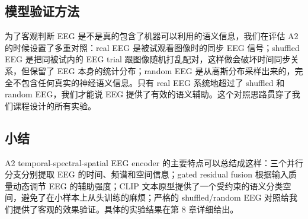 \subsection{模型验证方法}

为了客观判断 EEG 是不是真的包含了机器可以利用的语义信息，我们在评估 A2 的时候设置了多重对照：real EEG 是被试观看图像时的同步 EEG 信号；shuffled EEG 是把同被试内的 EEG trial 跟图像随机打乱配对，这样做会破坏时间同步关系，但保留了 EEG 本身的统计分布；random EEG 是从高斯分布采样出来的，完全不包含任何真实的神经语义信息。只有 real EEG 系统地超过了 shuffled 和 random EEG，我们才能说 EEG 提供了有效的语义辅助。这个对照思路贯穿了我们课程设计的所有实验。

\subsection{小结}

A2 temporal-spectral-spatial EEG encoder 的主要特点可以总结成这样：三个并行分支分别提取 EEG 的时间、频谱和空间信息；gated residual fusion 根据输入质量动态调节 EEG 的辅助强度；CLIP 文本原型提供了一个受约束的语义分类空间，避免了在小样本上从头训练的麻烦；严格的 shuffled/random EEG 对照给我们提供了客观的效果验证。具体的实验结果在第 8 章详细给出。
